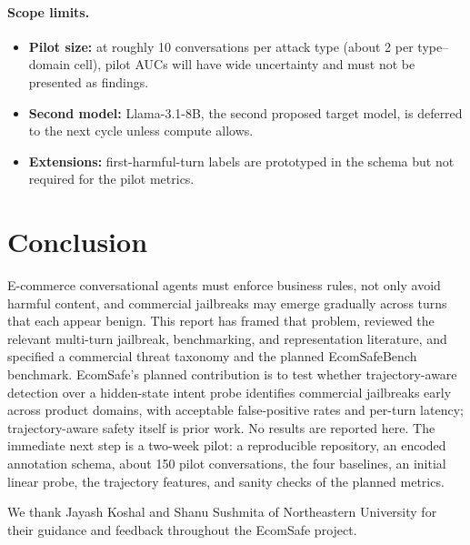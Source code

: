 \documentclass[sigconf]{acmart}
\begin{document}
\paragraph{Scope limits.}
\begin{itemize}
  \item \textbf{Pilot size:} at roughly 10 conversations per attack type (about 2 per type--domain cell), pilot AUCs will have wide uncertainty and must not be presented as findings.
  \item \textbf{Second model:} Llama-3.1-8B, the second proposed target model, is deferred to the next cycle unless compute allows.
  \item \textbf{Extensions:} first-harmful-turn labels are prototyped in the schema but not required for the pilot metrics.
\end{itemize}

\section{Conclusion}
\label{sec:conclusion}

E-commerce conversational agents must enforce business rules, not only avoid harmful content, and commercial jailbreaks may emerge gradually across turns that each appear benign. This report has framed that problem, reviewed the relevant multi-turn jailbreak, benchmarking, and representation literature, and specified a commercial threat taxonomy and the planned EcomSafeBench benchmark. EcomSafe's planned contribution is to test whether trajectory-aware detection over a hidden-state intent probe identifies commercial jailbreaks early across product domains, with acceptable false-positive rates and per-turn latency; trajectory-aware safety itself is prior work. No results are reported here. The immediate next step is a two-week pilot: a reproducible repository, an encoded annotation schema, about 150 pilot conversations, the four baselines, an initial linear probe, the trajectory features, and sanity checks of the planned metrics.

\begin{acks}
We thank Jayash Koshal and Shanu Sushmita of Northeastern University
for their guidance and feedback throughout the EcomSafe project.
\end{acks}



\end{document}
